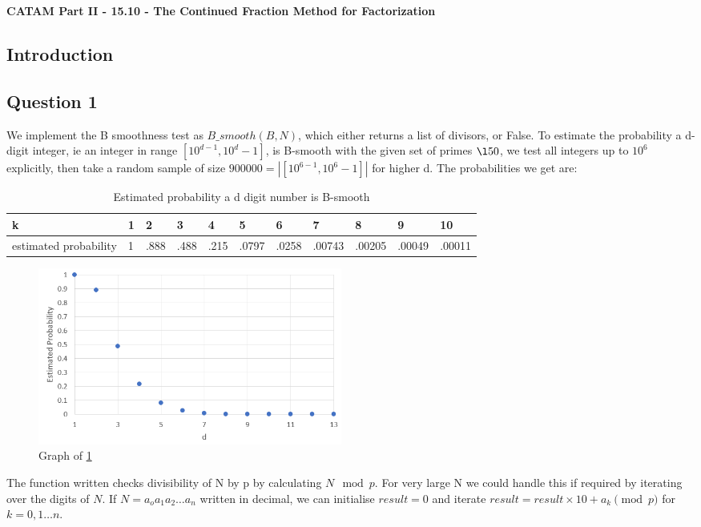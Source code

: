 \documentclass[10pt,a4paper]{report}
\begin{document}
\textbf{CATAM Part II - 15.10 - The Continued Fraction Method for
Factorization}
\thispagestyle{empty}

\newpage

\subsection*{Introduction}

\subsection*{Question 1}
We implement the B smoothness test as $B\_smooth(B,N)$, which either returns a list of divisors, or False. To estimate the probability a d-digit integer, ie an integer in range $[10^{d-1},10^d-1]$, is B-smooth with the given set of primes $\l 50$, we test all integers up to $10^6$ explicitly, then take a random sample of size $900000 = | [10^{6-1},10^6-1] |$ for higher d. The probabilities we get are:

\begin{table}[h]
\centering
\begin{tabular}{|l|l|l|l|l|l|l|l|l|l|l|}
\hline
k                     & 1 & 2    & 3    & 4    & 5     & 6     & 7      & 8      & 9      & 10     \\ \hline
estimated probability & 1 & .888 & .488 & .215 & .0797 & .0258 & .00743 & .00205 & .00049 & .00011 \\ \hline
\end{tabular}
\caption{Estimated probability a d digit number is B-smooth}
\label{tab:my-table}
\end{table}

\begin{figure}[h]
\centering
\includegraphics[width=10cm]{q1graph.png}
\caption{Graph of \ref{tab:my-table}}
\end{figure}

The function written checks divisibility of N by p by calculating $N \mod p$. For very large N we could handle this if required by iterating over the digits of $N$. If $N=a_oa_1a_2\dots a_n$ written in decimal, we can initialise $result=0$ and iterate $result=result\times10+a_k\pmod p$ for $k=0,1\dots n$.	
\end{document}
